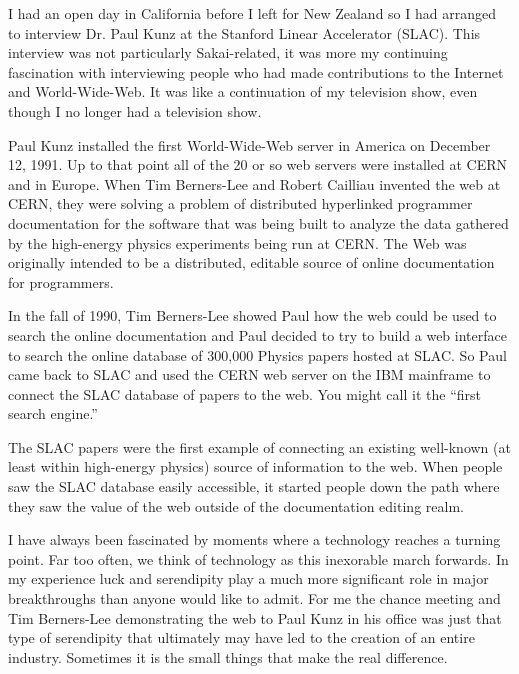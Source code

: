 \documentclass[12pt]{book}
\begin{document}
I had an open day in California before I left for New Zealand
so I had arranged
to interview Dr. Paul Kunz at the Stanford Linear
Accelerator (SLAC).  This interview was not particularly
Sakai-related, it was more my continuing fascination
with interviewing people who had made contributions
to the Internet and World-Wide-Web.  It was like
a continuation of my television show, even though
I no longer had a television show.

Paul Kunz installed the first World-Wide-Web server
in America on December 12, 1991.  Up to that point all
of the 20 or so web servers were installed at CERN
and in Europe.  When Tim Berners-Lee and Robert Cailliau
invented the web at CERN, they were solving a problem
of distributed hyperlinked programmer documentation
for the software that was being built to analyze the
data gathered by the high-energy physics experiments
being run at CERN.  The Web was originally intended
to be a distributed, editable source of online
documentation for programmers.

In the fall of 1990, Tim Berners-Lee showed Paul
how the web could be used to search the online
documentation and Paul decided to try to build a
web interface to search the online database of 300,000
Physics papers hosted at SLAC.  So Paul came back
to SLAC and used the CERN web server on the IBM
mainframe to connect
the SLAC database of papers to the web.  You might
call it the ``first search engine.''

The SLAC papers were the first example of connecting
an existing well-known (at least within high-energy
physics)
source of information to the web.  When people saw
the SLAC database easily accessible, it started
people down the path where they saw the value
of the web outside of the documentation editing
realm.

I have always been fascinated by moments where
a technology reaches a turning point.  Far too
often, we think of technology as this inexorable
march forwards.   In my experience luck and
serendipity play a much more significant role in major
breakthroughs than anyone would like to admit.
For me the chance meeting and Tim Berners-Lee
demonstrating the web to Paul Kunz in his office
was just that type of serendipity that ultimately
may have led to the creation of an entire industry.
Sometimes it is the small things that make the real
difference.


\end{document}
